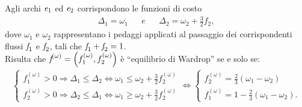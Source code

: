 \documentclass[11pt,largemargins]{homework}
\begin{document}
\begin{enumerate}
    

  \end{enumerate}

  \newpage
\section{}%
 
  
 \begin{alphaparts}
    \questionpart

    Agli archi $\emph{e}_{1}$ ed $\emph{e}_{2}$ corrispondono le funzioni di costo 
    \begin{align*}
    \Delta_{1}=\omega_{1} && e && \Delta_{2}=\omega_{2}+\frac{3}{2}f_{2},
    \end{align*}
   dove $\omega_{1}$ e $\omega_{2}$ rappresentano i pedaggi applicati al passaggio dei corrispondenti flussi $\emph{f}_{1}$ e $\emph{f}_{2}$, tali che $\emph{f}_{1}+\emph{f}_{2}=1$.\\
    Risulta che $\emph{f}^{(\omega)}=\left(f_{1}^{(\omega)},f_{2}^{(\omega)}\right)$  è  ``equilibrio  di  Wardrop'' se e solo se:
    \begin{align*}    
    \begin{cases}f_{1}^{(\omega)}>0  \Rightarrow  \Delta_{1}\leq\Delta_{2}  \Leftrightarrow  \omega_{1}  \leq  \omega_{2}+\frac{3}{2}f_{2}^{(\omega)}\\
    f_{2}^{(\omega)}>0  \Rightarrow  \Delta_{2}\leq\Delta_{1}  \Leftrightarrow  \omega_{1}  \geq  \omega_{2}+\frac{3}{2}f_{2}^{(\omega)}\end{cases}
    \Leftrightarrow \begin{cases}f_{2}^{(\omega)}=\frac{2}{3}\left(\omega_{1}-\omega_{2}\right)\\ f_{1}^{(\omega)}=1-\frac{2}{3}\left(\omega_{1}-\omega_{2}\right).\end{cases}
    \end{align*}
    

\end{alphaparts}
\end{document}
